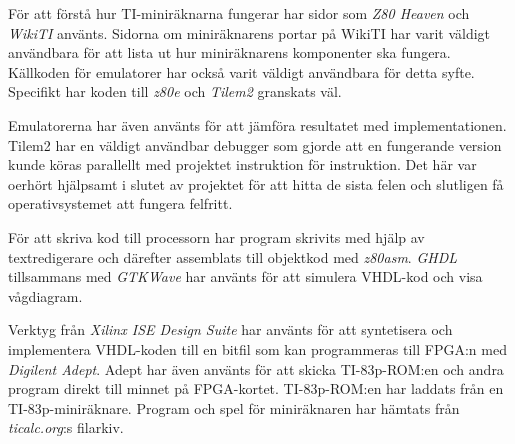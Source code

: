 \documentclass[main.tex]{subfiles}
\begin{document}
För att förstå hur TI-miniräknarna fungerar har sidor som {\it Z80
Heaven}\cite{z80heaven} och {\it WikiTI}\cite{wikiti} använts. Sidorna om
miniräknarens portar på WikiTI har varit väldigt användbara för att lista ut
hur miniräknarens komponenter ska fungera. Källkoden för emulatorer har också
varit väldigt användbara för detta syfte. Specifikt har koden till {\it
z80e}\cite{z80e} och {\it Tilem2}\cite{tilem2} granskats väl.

Emulatorerna har även använts för att jämföra resultatet med implementationen.
Tilem2 har en väldigt användbar debugger som gjorde att en fungerande version
kunde köras parallellt med projektet instruktion för instruktion. Det här var
oerhört hjälpsamt i slutet av projektet för att hitta de sista felen och
slutligen få operativsystemet att fungera felfritt.

För att skriva kod till processorn har program skrivits med hjälp av
textredigerare och därefter assemblats till objektkod med {\it
z80asm}\cite{z80asm}. {\it GHDL}\cite{ghdl} tillsammans med {\it
GTKWave}\cite{gtkwave} har använts för att simulera VHDL-kod och visa
vågdiagram.

Verktyg från {\it Xilinx ISE Design Suite} har använts för att syntetisera och
implementera VHDL-koden till en bitfil som kan programmeras till FPGA:n med
{\it Digilent Adept}. Adept har även använts för att skicka TI-83p-ROM:en och
andra program direkt till minnet på FPGA-kortet.  TI-83p-ROM:en har laddats
från en TI-83p-miniräknare. Program och spel för miniräknaren har hämtats från
{\it ticalc.org}:s filarkiv\cite{ticalc}.
\end{document}
